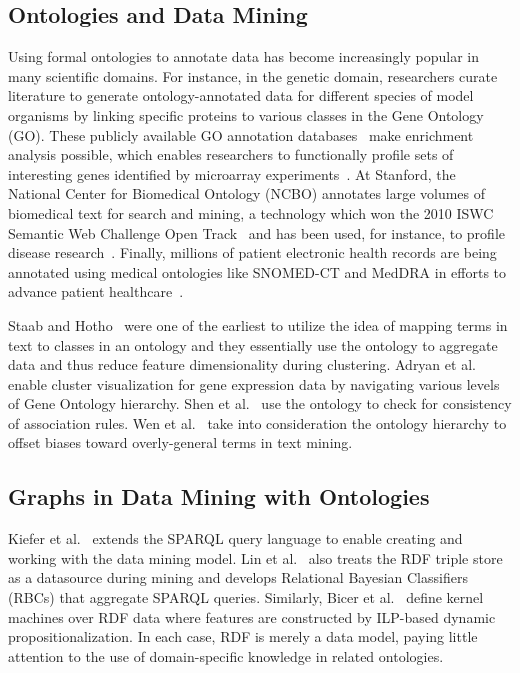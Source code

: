 \subsection{Ontologies and Data Mining}
Using formal ontologies to annotate data has become increasingly popular in many scientific domains. For instance, in the genetic domain, researchers curate literature to generate ontology-annotated data for different species of model organisms by linking specific proteins to various classes in the Gene Ontology (GO). These publicly available GO annotation databases~\cite{GOAurl} make enrichment analysis possible, which enables researchers to functionally profile sets of interesting genes identified by microarray experiments~\cite{Khatri2005}.  At Stanford, the National Center for Biomedical Ontology (NCBO) annotates large volumes of biomedical text for search and mining, a technology which won the 2010 ISWC Semantic Web Challenge Open Track~\cite{RI,SWCurl} and has been used, for instance, to profile disease research~\cite{Liu2012}.  Finally, millions of patient electronic health records are being annotated using medical ontologies like SNOMED-CT and MedDRA in efforts to advance patient healthcare~\cite{OMOP}.

Staab and Hotho~\cite{StaabH03} were one of the earliest to utilize the idea of mapping terms in text to classes in an ontology and they essentially use the ontology to aggregate data and thus reduce feature dimensionality during clustering.  Adryan et al.~\cite{Adryan2004} enable cluster visualization for gene expression data by navigating various levels of Gene Ontology hierarchy.  Shen et al.~\cite{Shen2006Ont} use the ontology to check for consistency of association rules. Wen et al.~\cite{Wen2007Ont} take into consideration the ontology hierarchy to offset biases toward overly-general terms in text mining.

\subsection{Graphs in Data Mining with Ontologies}

Kiefer et al.~\cite{Kiefer2008Adding} extends the SPARQL query language to enable creating and working with the data mining model. Lin et al.~\cite{Lin2011Learning} also treats the RDF triple store as a datasource during mining and develops Relational Bayesian Classifiers (RBCs) that aggregate SPARQL queries. Similarly, Bicer et al.~\cite{Bicer2011Relational} define kernel machines over RDF data where features are constructed by ILP-based dynamic propositionalization. In each case, RDF is merely a data model, paying little attention to the use of domain-specific knowledge in related ontologies.

